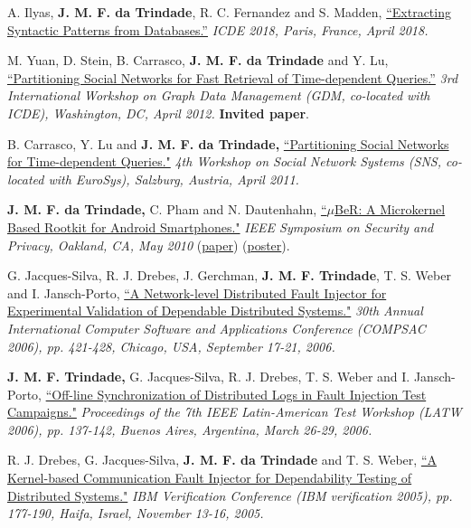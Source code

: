 \documentclass[line,margin]{res}
\begin{document}
\begin{resume}
A. Ilyas, \textbf{J. M. F. da Trindade}, R. C. Fernandez and S. Madden, \href{https://arxiv.org/pdf/1710.11528.pdf}{``Extracting Syntactic Patterns from Databases.''} \textit{ICDE 2018, Paris, France, April 2018.}

M. Yuan, D. Stein, B. Carrasco, \textbf{J. M. F. da Trindade} and Y. Lu, \href{http://joanatrindade.wdfiles.com/local--files/curriculum/gdm2012-paper.pdf}{``Partitioning Social Networks for Fast Retrieval of Time-dependent Queries.''} \textit{3rd International Workshop on Graph Data Management (GDM, co-located with ICDE), Washington, DC, April 2012.} \textbf{Invited paper}.

B. Carrasco, Y. Lu and \textbf{J. M. F. da Trindade,} \href{http://research.microsoft.com/en-us/projects/ldg/a04-carrasco.pdf}{``Partitioning Social Networks for Time-dependent Queries."} \textit{4th Workshop on Social Network Systems (SNS, co-located with EuroSys), Salzburg, Austria, April 2011.}

\textbf{J. M. F. da Trindade,} C. Pham and N. Dautenhahn, \href{http://joanatrindade.wikidot.com/local--files/curriculum/oakland2010-paper.pdf}{``$\mu$BeR: A Microkernel Based Rootkit for Android Smartphones."} \textit{IEEE Symposium on Security and Privacy, Oakland, CA, May 2010} (\href{http://joanatrindade.wikidot.com/local--files/curriculum/oakland2010-paper.pdf}{paper}) (\href{http://joanatrindade.wikidot.com/local--files/curriculum/oakland2010-poster.pdf}{poster}).

G. Jacques-Silva, R. J. Drebes, J. Gerchman, \textbf{J. M. F. Trindade}, T. S. Weber and I. Jansch-Porto, \href{http://doi.ieeecomputersociety.org/10.1109/COMPSAC.2006.12}{``A Network-level Distributed Fault Injector for Experimental Validation of Dependable Distributed Systems."} \textit{30th Annual International Computer Software and Applications Conference (COMPSAC 2006), pp. 421-428, Chicago, USA, September 17-21, 2006.}

\textbf{J. M. F. Trindade,} G. Jacques-Silva, R. J. Drebes, T. S. Weber and I. Jansch-Porto, \href{http://joanatrindade.wikidot.com/local--files/curriculum/latw2006.pdf}{``Off-line Synchronization of Distributed Logs in Fault Injection Test Campaigns."} \textit{Proceedings of the 7th IEEE Latin-American Test Workshop (LATW 2006), pp. 137-142, Buenos Aires, Argentina, March 26-29, 2006.}

R. J. Drebes, G. Jacques-Silva, \textbf{J. M. F. da Trindade} and T. S. Weber, \href{http://www.haifa.ibm.com/Workshops/PADTAD2005/papers/drebes.pdf}{``A Kernel-based Communication Fault Injector for Dependability Testing of Distributed Systems."} \textit{IBM Verification Conference (IBM verification 2005), pp. 177-190, Haifa, Israel, November 13-16, 2005.}


\end{resume}
\end{document}
